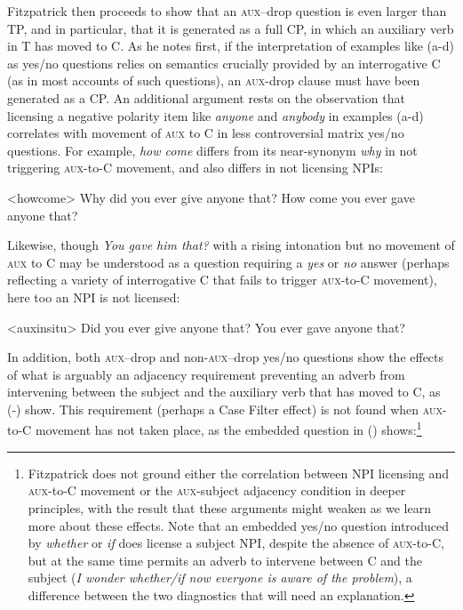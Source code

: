 \documentclass[output=paper]{langscibook}
\begin{document}
Fitzpatrick then proceeds to show that an \textsc{aux}--drop question is even larger than TP, and in particular, that it is generated as a full CP, in which an auxiliary verb in T has moved to C. As he notes first, if the interpretation of examples like \noindent (a-d) as yes/no questions relies on semantics crucially provided by an interrogative C (as in most accounts of such questions), an \textsc{aux-}drop clause\textsc{ }must have been generated as a CP. An additional argument rests on the observation that licensing a negative polarity item like \textit{anyone} and \textit{anybody} in examples \noindent (a-d) correlates with movement of \textsc{aux} to C in less controversial matrix yes/no questions. For example, \textit{how come} differs from its near-synonym \textit{why} in not triggering \textsc{aux}-to-C movement, and also differs in not licensing NPIs:

\pex<howcome> 
\a Why did you ever give anyone that?
\a \ljudge{*}How come you ever gave anyone that? 
\xe

\noindent Likewise, though \textit{You gave him that? }with a rising intonation but no movement of \textsc{aux} to C may be understood as a question requiring a \textit{yes} or \textit{no }answer (perhaps reflecting a variety of interrogative C that fails to trigger \textsc{aux-}to-C movement), here too an NPI is not licensed:

\pex<auxinsitu>
\a Did you ever give anyone that?
\a \ljudge{*}You ever gave anyone that? 
\xe

\noindent In addition, both \textsc{aux}--drop and non-\textsc{aux}--drop yes/no questions show the effects of what is arguably an adjacency requirement preventing an adverb from intervening between the subject and the auxiliary verb that has moved to C, as (-) show. This requirement (perhaps a Case Filter effect) is not found when \textsc{aux-}to-C movement has not taken place, as the embedded question in () shows:\footnote{Fitzpatrick does not ground either the correlation between NPI licensing and \textsc{aux}-to-C movement or the \textsc{aux-}subject adjacency condition in deeper principles, with the result that these arguments might weaken as we learn more about these effects. Note that an embedded yes/no question introduced by \textit{whether} or \textit{if} does license a subject NPI, despite the absence of \textsc{aux}-to-C, but at the same time permits an adverb to intervene between C and the subject (\textit{I wonder whether/if now everyone is aware of the problem}), a difference between the two diagnostics that will need an explanation.}
\end{document}
